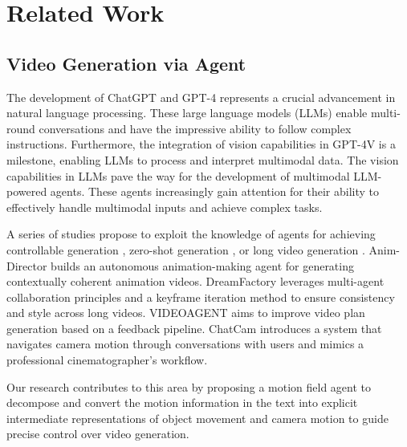 \section{Related Work}
\label{sec:relatedwork}

\subsection{Video Generation via Agent}
The development of ChatGPT \cite{Chatgpt} and GPT-4 \cite{achiam2023gpt} represents a crucial advancement in natural language processing. These large language models (LLMs) \cite{touvron2023llama,zeng2022glm,taori2023stanford,liu2024visual,zhang2023video} enable multi-round conversations and have the impressive ability to follow complex instructions. Furthermore, the integration of vision capabilities in GPT-4V \cite{yang2023dawn} is a milestone, enabling LLMs to process and interpret multimodal data. The vision capabilities in LLMs pave the way for the development of multimodal LLM-powered agents. These agents increasingly gain attention for their ability to effectively handle multimodal inputs and achieve complex tasks.

A series of studies propose to exploit the knowledge of agents for achieving controllable generation \cite{lian2023llm,feng2024layoutgpt,lin2023videodirectorgpt}, zero-shot generation \cite{huang2024free,lu2023flowzero,hong2023direct2v,oh2023mtvg}, or long video generation \cite{zhuang2024vlogger,tian2024videotetris}. Anim-Director \cite{li2024anim} builds an autonomous animation-making agent for generating contextually coherent animation videos. DreamFactory \cite{xie2024dreamfactory} leverages multi-agent collaboration principles and a keyframe iteration method to ensure consistency and style across long videos. VIDEOAGENT \cite{soni2024videoagent} aims to improve video plan generation based on a feedback pipeline. ChatCam \cite{liu2024chatcam} introduces a system that navigates camera motion through conversations with users and mimics a professional cinematographer’s workflow.

Our research contributes to this area by proposing a motion field agent to decompose and convert the motion information in the text into explicit intermediate representations of object movement and camera motion to guide precise control over video generation.

